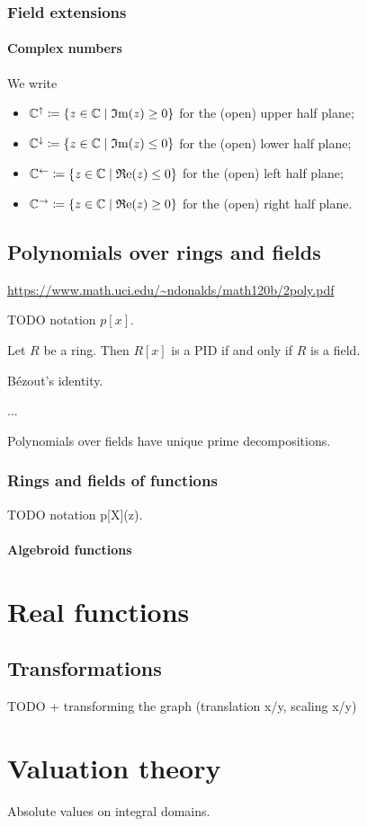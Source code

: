 \subsection{Field extensions}
\subsubsection{Complex numbers}
\begin{definition}
We write
\begin{itemize}
\item $\C^{\uparrow} \defeq \setbuilder{z\in\C}{\Im(z) \geq 0}$ for the (open) upper half plane;
\item $\C^{\downarrow} \defeq \setbuilder{z\in\C}{\Im(z) \leq 0}$ for the (open) lower half plane;
\item $\C^{\leftarrow} \defeq \setbuilder{z\in\C}{\Re(z) \leq 0}$ for the (open) left half plane;
\item $\C^{\rightarrow}  \defeq \setbuilder{z\in\C}{\Re(z) \geq 0}$ for the (open) right half plane.
\end{itemize}
\end{definition}

\section{Polynomials over rings and fields}
\url{https://www.math.uci.edu/~ndonalds/math120b/2poly.pdf}

TODO notation $p[x]$.

\begin{proposition}
Let $R$ be a ring. Then $R[x]$ is a PID \textup{if and only if} $R$ is a field.
\end{proposition}
\begin{corollary}
Bézout's identity.

...
\end{corollary}


\begin{proposition}
Polynomials over fields have unique prime decompositions.
\end{proposition}

\subsection{Rings and fields of functions}
TODO notation p[X](z).

\subsubsection{Algebroid functions}

\chapter{Real functions}

\section{Transformations}
TODO + transforming the graph (translation x/y, scaling x/y)



\chapter{Valuation theory}
Absolute values on integral domains.